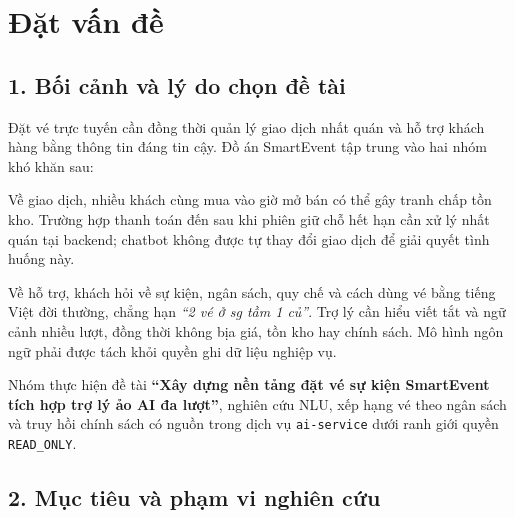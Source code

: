 \chapter*{Đặt vấn đề}
{}

\section*{1. Bối cảnh và lý do chọn đề tài}
{}

Đặt vé trực tuyến cần đồng thời quản lý giao dịch nhất quán và hỗ trợ khách hàng bằng thông tin đáng tin cậy. Đồ án SmartEvent tập trung vào hai nhóm khó khăn sau:

Về giao dịch, nhiều khách cùng mua vào giờ mở bán có thể gây tranh chấp tồn kho. Trường hợp thanh toán đến sau khi phiên giữ chỗ hết hạn cần xử lý nhất quán tại backend; chatbot không được tự thay đổi giao dịch để giải quyết tình huống này.

Về hỗ trợ, khách hỏi về sự kiện, ngân sách, quy chế và cách dùng vé bằng tiếng Việt đời thường, chẳng hạn \textit{``2 vé ở sg tầm 1 củ''}. Trợ lý cần hiểu viết tắt và ngữ cảnh nhiều lượt, đồng thời không bịa giá, tồn kho hay chính sách. Mô hình ngôn ngữ phải được tách khỏi quyền ghi dữ liệu nghiệp vụ.

Nhóm thực hiện đề tài \textbf{``Xây dựng nền tảng đặt vé sự kiện SmartEvent tích hợp trợ lý ảo AI đa lượt''}, nghiên cứu NLU, xếp hạng vé theo ngân sách và truy hồi chính sách có nguồn trong dịch vụ \texttt{ai-service} dưới ranh giới quyền \texttt{READ\_ONLY}.

\section*{2. Mục tiêu và phạm vi nghiên cứu}
{}


